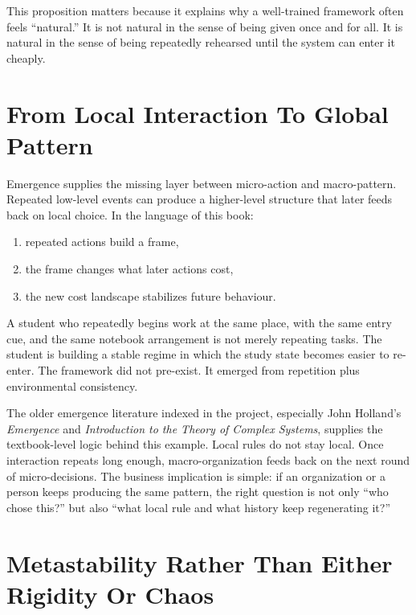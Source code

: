 \begin{discussion}
This proposition matters because it explains why a well-trained framework often
feels ``natural.'' It is not natural in the sense of being given once and for
all. It is natural in the sense of being repeatedly rehearsed until the system
can enter it cheaply.
\end{discussion}

\section{From Local Interaction To Global Pattern}

Emergence supplies the missing layer between micro-action and macro-pattern.
Repeated low-level events can produce a higher-level structure that later feeds
back on local choice. In the language of this book:
\begin{enumerate}[nosep]
  \item repeated actions build a frame,
  \item the frame changes what later actions cost,
  \item the new cost landscape stabilizes future behaviour.
\end{enumerate}

\begin{example}
A student who repeatedly begins work at the same place, with the same entry
cue, and the same notebook arrangement is not merely repeating tasks. The
student is building a stable regime in which the study state becomes easier to
re-enter. The framework did not pre-exist. It emerged from repetition plus
environmental consistency.
\end{example}

The older emergence literature indexed in the project, especially John
Holland's \emph{Emergence} and \emph{Introduction to the Theory of Complex
Systems}, supplies the textbook-level logic behind this example. Local rules do
not stay local. Once interaction repeats long enough, macro-organization feeds
back on the next round of micro-decisions. The business implication is simple:
if an organization or a person keeps producing the same pattern, the right
question is not only ``who chose this?'' but also ``what local rule and what
history keep regenerating it?''

\section{Metastability Rather Than Either Rigidity Or Chaos}

